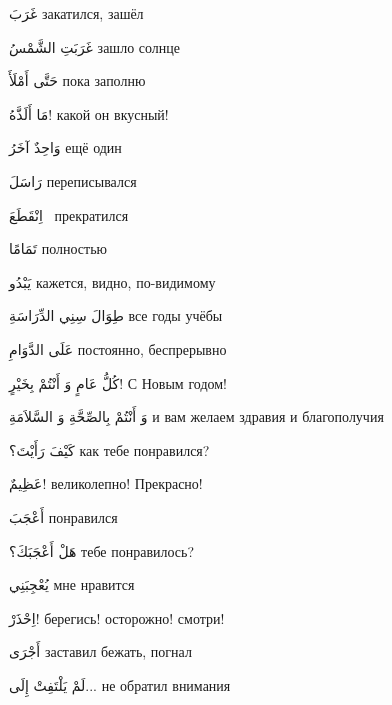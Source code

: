\documentclass[a5paper]{article}
\newcommand\textstyleDropCaps[1]{#1}
\newcommand\textstyleCaptioncharacters[1]{#1}
\begin{document}
\textstyleCaptioncharacters{غَرَبَ }\textstyleDropCaps{закатился, зашёл ‎}

\textstyleCaptioncharacters{غَرَبَتِ الشَّمْسُ }\textstyleDropCaps{зашло солнце‎}

\textstyleCaptioncharacters{حَتَّى أَمْلَأَ }\textstyleDropCaps{пока заполню ‎}

\textstyleCaptioncharacters{مَا أَلَذَّهُ! }\textstyleDropCaps{какой он вкус­ный! ‎}

\textstyleCaptioncharacters{وَاحِدٌ آخَرُ }\textstyleDropCaps{ещё один ‎}

\textstyleCaptioncharacters{رَاسَلَ }\textstyleDropCaps{переписывался ‎}

\textstyleCaptioncharacters{اِنْقَطَعَ \ }\textstyleDropCaps{прекратился‎}

\textstyleCaptioncharacters{تَمَامًا }\textstyleDropCaps{полностью‎}

\textstyleCaptioncharacters{يَبْدُو }\textstyleDropCaps{кажется, видно, по-видимому‎}

\textstyleCaptioncharacters{طِوَالَ سِنِي الدِّرَاسَةِ }\textstyleDropCaps{все годы учёбы‎}

\textstyleCaptioncharacters{عَلَى الدَّوَامِ }\textstyleDropCaps{постоянно, беспрерывно‎}

\textstyleCaptioncharacters{كُلُّ عَامٍ وَ أَنْتُمْ بِخَيْرٍ! }\textstyleDropCaps{С Новым годом! ‎}

\textstyleCaptioncharacters{وَ أَنْتُمْ بِالصِّحَّةِ وَ السَّلاَمَةِ }\textstyleDropCaps{и вам желаем здравия и благополучия‎}

\textstyleCaptioncharacters{كَيْفَ رَأَيْتَ؟ }\textstyleDropCaps{как тебе понравился?‎}

\textstyleCaptioncharacters{عَظِيمٌ! }\textstyleDropCaps{великолепно! Пре­красно!‎}

\textstyleCaptioncharacters{أَعْجَبَ }\textstyleDropCaps{понравился‎}

\textstyleCaptioncharacters{هَلْ أَعْجَبَكَ؟ }\textstyleDropCaps{тебе по­нравилось?‎}

\textstyleCaptioncharacters{يُعْجِبَنِي }\textstyleDropCaps{мне нравится‎}

\textstyleCaptioncharacters{اِحْذَرْ! }\textstyleDropCaps{берегись! осторож­но! смотри!‎}

\textstyleCaptioncharacters{أَجْرَى }\textstyleDropCaps{заставил бежать, погнал‎}

\textstyleCaptioncharacters{لَمْ يَلْتَفِتْ إِلَى... }\textstyleDropCaps{не обратил внимания‎}
\end{document}
